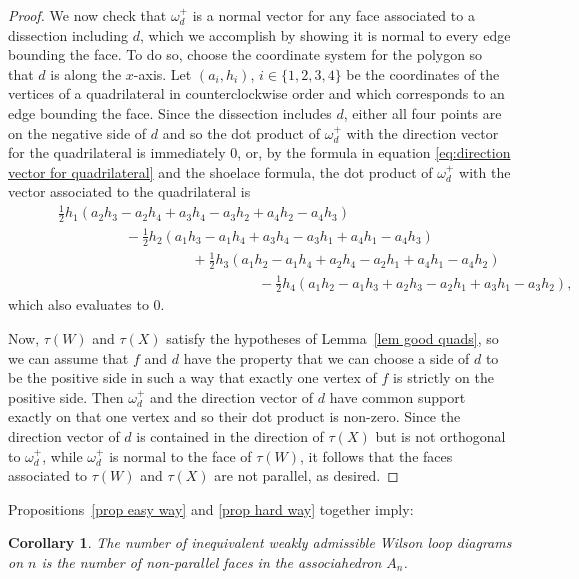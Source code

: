 \documentclass[11pt]{article}
\newtheorem{cor}[thm]{Corollary}
\theoremstyle{remark}
\theoremstyle{definition}
\begin{document}
\begin{proof}
    We now check that $\omega^+_d$ is a normal vector for any face associated to a dissection including $d$, which we accomplish by showing it is normal to every edge bounding the face.  To do so, choose the coordinate system for the polygon so that $d$ is along the $x$-axis.  Let $(a_i, h_i)$, $i\in \{1,2,3,4\}$ be the coordinates of the vertices of a quadrilateral in counterclockwise order and which corresponds to an edge bounding the face.  Since the dissection includes $d$, either all four points are on the negative side of $d$ and so the dot product of $\omega^+_d$ with the direction vector for the quadrilateral is immediately $0$, or, by the formula in equation \eqref{eq:direction vector for quadrilateral} and the shoelace formula, the dot product of $\omega^+_d$ with the vector associated to the quadrilateral is
   \begin{align*}
       & \hspace{1cm}\textstyle\frac{1}{2}h_1(a_2h_3-a_2h_4+a_3h_4-a_3h_2+a_4h_2-a_4h_3) \\
       &\hspace{3cm} - \textstyle\frac{1}{2} h_2(a_1h_3-a_1h_4+a_3h_4-a_3h_1+a_4h_1-a_4h_3) \\
       &\hspace{5cm}+ \textstyle\frac{1}{2}h_3(a_1h_2-a_1h_4+a_2h_4-a_2h_1+a_4h_1-a_4h_2) \\
       &\hspace{7cm}- \textstyle\frac{1}{2}h_4(a_1h_2-a_1h_3+a_2h_3-a_2h_1+a_3h_1-a_3h_2), 
    \end{align*}
    which also evaluates to 0.

    Now, $\tau(W)$ and $\tau(X)$ satisfy the hypotheses of Lemma~\ref{lem good quads}, so we can assume that $f$ and $d$ have the property that we can choose a side of $d$ to be the positive side in such a way that exactly one vertex of $f$ is strictly on the positive side.  Then $\omega^+_d$ and the direction vector of $d$ have common support exactly on that one vertex and so their dot product is non-zero.  Since the direction vector of $d$ is contained in the direction of $\tau(X)$ but is not orthogonal to $\omega^+_d$, while $\omega^+_d$ is normal to the face of $\tau(W)$, it follows that the faces associated to $\tau(W)$ and $\tau(X)$ are not parallel, as desired.
\end{proof}


Propositions~\ref{prop easy way} and \ref{prop hard way} together imply:
\begin{cor}\label{cor:count inequiv diagrams}
  The number of inequivalent weakly admissible Wilson loop diagrams on $n$ is the number of non-parallel faces in the associahedron $A_n$.
\end{cor}
\end{document}
